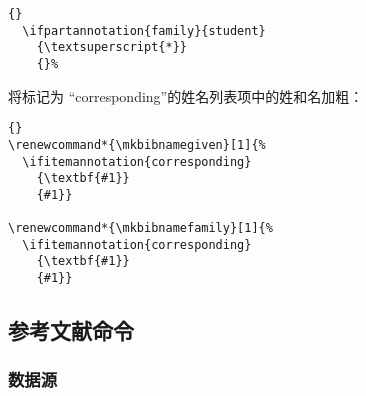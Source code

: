 \begin{lstlisting}[style=latex]{}
  \ifpartannotation{family}{student}
    {\textsuperscript{*}}
    {}%
\end{lstlisting}
%
将标记为 “corresponding”的姓名列表项中的姓和名加粗：

\begin{lstlisting}[style=latex]{}
\renewcommand*{\mkbibnamegiven}[1]{%
  \ifitemannotation{corresponding}
    {\textbf{#1}}
    {#1}}

\renewcommand*{\mkbibnamefamily}[1]{%
  \ifitemannotation{corresponding}
    {\textbf{#1}}
    {#1}}
\end{lstlisting}

\subsection{参考文献命令}%
\label{use:bib}

\subsubsection{数据源}%
\label{use:bib:res}

